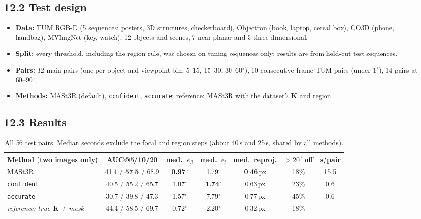 \documentclass[11pt,a4paper]{article}
\newcommand{\K}{\mathbf{K}}
\begin{document}
\subsection*{12.2 Test design}
\begin{itemize}
  \item \textbf{Data:} TUM RGB-D (5 sequences: posters, 3D structures, checkerboard), Objectron (book, laptop, cereal box), CO3D (phone, handbag), MVImgNet (key, watch); 12 objects and scenes, 7 near-planar and 5 three-dimensional.
  \item \textbf{Split:} every threshold, including the region rule, was chosen on tuning sequences only; results are from held-out test sequences.
  \item \textbf{Pairs:} 32 main pairs (one per object and viewpoint bin: 5--15, 15--30, 30--60$^\circ$), 10 consecutive-frame TUM pairs (under $1^\circ$), 14 pairs at 60--90$^\circ$.
  \item \textbf{Methods:} MASt3R (default), \texttt{confident}, \texttt{accurate}; reference: MASt3R with the dataset's $\K$ and region.
\end{itemize}

\subsection*{12.3 Results}
\begin{table}[H]\centering\small
\begin{tabular}{lcccccc}
\toprule
Method (two images only) & AUC@5/10/20 & med.\ $e_R$ & med.\ $e_t$ & med.\ reproj. & $>20^\circ$ off & s/pair\\
\midrule
MASt3R & 41.4 / \textbf{57.5} / 68.9 & \textbf{0.97}$^\circ$ & 1.79$^\circ$ & \textbf{0.46}\,px & 18\% & 15.5\\
\texttt{confident} & 40.5 / 55.2 / 65.7 & 1.07$^\circ$ & \textbf{1.74}$^\circ$ & 0.63\,px & 23\% & 0.6\\
\texttt{accurate} & 30.7 / 39.8 / 47.3 & 1.57$^\circ$ & 7.79$^\circ$ & 0.77\,px & 45\% & 0.6\\
\midrule
\emph{reference: true $\K$ + mask} & 44.4 / 58.5 / 69.7 & 0.72$^\circ$ & 2.20$^\circ$ & 0.32\,px & 18\% & --\\
\bottomrule
\end{tabular}
\caption{All 56 test pairs. Median seconds exclude the focal and region steps (about 40\,s and 25\,s, shared by all methods).}
\end{table}
\end{document}
